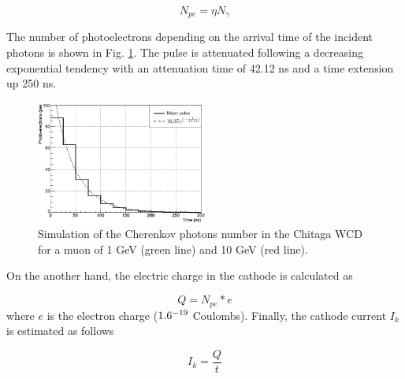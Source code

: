 \documentclass[letterpaper, 10 pt, conference]{ieeeconf}  %
\begin{document}
\begin{equation}
N_{pe} = \eta N_{\gamma}
\end{equation}

The number of photoelectrons depending on the arrival time of the incident photons is shown in Fig. \ref{pulse_G4}. The pulse is attenuated following a decreasing exponential tendency with an attenuation time of  42.12 ns and a time extension up 250 ns.

\begin{figure}[h!]
\begin{center}
\includegraphics[width=0.5\textwidth]{Figures/pulse_vem.png}
\caption{Simulation of the Cherenkov photons number in the Chitaga WCD for a muon of 1 GeV (green line) and 10 GeV (red line). }
\label{pulse_G4}
\end{center}
\end{figure}



On the another hand, the electric charge in the cathode is calculated as

\begin{equation}
Q = N_{pe}*e
\end{equation}
where $e$ is the electron charge ($1.6 \time 10^{-19}$ Coulombs). Finally, the cathode current $I_k$ is estimated as follows

\begin{equation}
I_k = \frac{Q}{t}
\end{equation}
\end{document}
